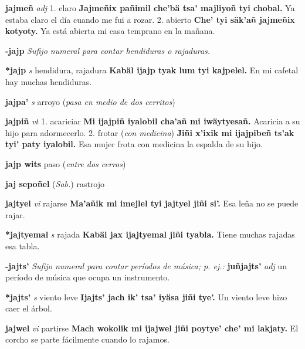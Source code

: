 \documentclass[10pt]{scrbook}
\newcommand{\entry}[1]{\textbf{#1}}
\newcommand{\onedefinition}[1]{#1.}
\newcommand{\nontranslationdef}[1]{\textit{#1}}
\newcommand{\partofspeech}[1]{\textit{#1}}
\newcommand{\spanishtranslation}[1]{#1}
\newcommand{\clarification}[1]{(\textit{#1})}
\newcommand{\cholexample}[1]{\textbf{#1}}
\newcommand{\exampletranslation}[1]{#1}
\newcommand{\relevantdialect}[1]{(\textit{#1})}
\begin{document}
\begin{multicols}{2}
\entry{jajmeñ}
\partofspeech{adj}
\onedefinition{1}
\spanishtranslation{claro}
\cholexample{Jajmeñix pañimil che'bä tsa' majliyoñ tyi chobal.}
\exampletranslation{Ya estaba claro el día cuando me fui a rozar.}
\onedefinition{2}
\spanishtranslation{abierto}
\cholexample{Che' tyi säk'añ jajmeñix kotyoty.}
\exampletranslation{Ya está abierta mi casa temprano en la mañana.}

\entry{-jajp}
\nontranslationdef{Sufijo numeral para contar hendiduras o rajaduras.}

\entry{*jajp}
\partofspeech{s}
\spanishtranslation{hendidura, rajadura}
\cholexample{Kabäl ijajp tyak lum tyi kajpelel.}
\exampletranslation{En mi cafetal hay muchas hendiduras.}

\entry{jajpa'}
\partofspeech{s}
\spanishtranslation{arroyo}
\clarification{pasa en medio de dos cerritos}

\entry{jajpiñ}
\partofspeech{vt}
\onedefinition{1}
\spanishtranslation{acariciar}
\cholexample{Mi ijajpiñ iyalobil cha'añ mi iwäytyesañ.}
\exampletranslation{Acaricia a su hijo para adormecerlo.}
\onedefinition{2}
\spanishtranslation{frotar}
\clarification{con medicina}
\cholexample{Jiñi x'ixik mi ijajpibeñ ts'ak tyi' paty iyalobil.}
\exampletranslation{Esa mujer frota con medicina la espalda de su hijo.}

\entry{jajp wits}
\spanishtranslation{paso}
\clarification{entre dos cerros}

\entry{jaj sepoñel}
\relevantdialect{Sab.}
\spanishtranslation{rastrojo}

\entry{jajtyel}
\partofspeech{vi}
\spanishtranslation{rajarse}
\cholexample{Ma'añik mi imejlel tyi jajtyel jiñi si'.}
\exampletranslation{Esa leña no se puede rajar.}

\entry{*jajtyemal}
\partofspeech{s}
\spanishtranslation{rajada}
\cholexample{Kabäl jax ijajtyemal jiñi tyabla.}
\exampletranslation{Tiene muchas rajadas esa tabla.}

\entry{-jajts'}
\nontranslationdef{Sufijo numeral para contar períodos de música; p. ej.:}
\cholexample{juñjajts'}
\partofspeech{adj}
\exampletranslation{un período de música que ocupa un instrumento.}

\entry{*jajts'}
\partofspeech{s}
\spanishtranslation{viento leve}
\cholexample{Ijajts' jach ik' tsa' iyäsa jiñi tye'.}
\exampletranslation{Un viento leve hizo caer el árbol.}

\entry{jajwel}
\partofspeech{vi}
\spanishtranslation{partirse}
\cholexample{Mach wokolik mi ijajwel jiñi poytye' che' mi lakjaty.}
\exampletranslation{El corcho se parte fácilmente cuando lo rajamos.}


\end{multicols}
\end{document}
